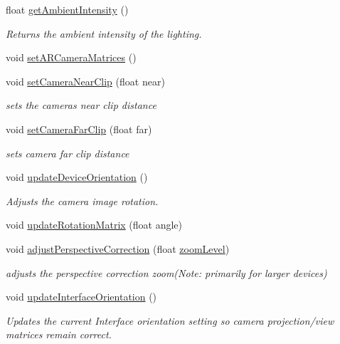 \begin{DoxyCompactItemize}
float \mbox{\hyperlink{class_a_r_core_1_1_a_r_cam_a98cb7f152cbc3028d258705da1591a55}{get\+Ambient\+Intensity}} ()
\begin{DoxyCompactList}\small\item\em Returns the ambient intensity of the lighting. \end{DoxyCompactList}\item 
void \mbox{\hyperlink{class_a_r_core_1_1_a_r_cam_ac554b8254ea4a22f122f25542694dafa}{set\+A\+R\+Camera\+Matrices}} ()
\item 
void \mbox{\hyperlink{class_a_r_core_1_1_a_r_cam_a040d67ba6abb95e914760ca6e64ac664}{set\+Camera\+Near\+Clip}} (float near)
\begin{DoxyCompactList}\small\item\em sets the camera\textquotesingle{}s near clip distance \end{DoxyCompactList}\item 
void \mbox{\hyperlink{class_a_r_core_1_1_a_r_cam_aa29191b58c0e6613850916526c6ab380}{set\+Camera\+Far\+Clip}} (float far)
\begin{DoxyCompactList}\small\item\em sets camera far clip distance \end{DoxyCompactList}\item 
void \mbox{\hyperlink{class_a_r_core_1_1_a_r_cam_a0c910d5c7f637ce2820132255dfb67f7}{update\+Device\+Orientation}} ()
\begin{DoxyCompactList}\small\item\em Adjusts the camera image rotation. \end{DoxyCompactList}\item 
void \mbox{\hyperlink{class_a_r_core_1_1_a_r_cam_a1813b2b0f2665741173228ffff518d67}{update\+Rotation\+Matrix}} (float angle)
\item 
void \mbox{\hyperlink{class_a_r_core_1_1_a_r_cam_ae2ecd3007e6684d1686c89d2ac3e7020}{adjust\+Perspective\+Correction}} (float \mbox{\hyperlink{class_a_r_core_1_1_a_r_cam_ac17d3b7fd12f51b2c54b7241efd36cd4}{zoom\+Level}})
\begin{DoxyCompactList}\small\item\em adjusts the perspective correction zoom(\+Note\+: primarily for larger devices) \end{DoxyCompactList}\item 
void \mbox{\hyperlink{class_a_r_core_1_1_a_r_cam_ac649b1e884931f123afd4dcecc1e3e6c}{update\+Interface\+Orientation}} ()
\begin{DoxyCompactList}\small\item\em Updates the current Interface orientation setting so camera projection/view matrices remain correct. \end{DoxyCompactList}\item 

\end{DoxyCompactItemize}
